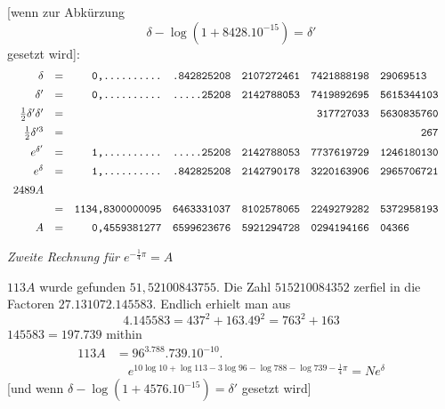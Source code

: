 [wenn zur Abkürzung
\[
\delta-\log(1+8428.10^{-15})=\delta'
\]
gesetzt wird]:
\begingroup\footnotesize\setlength{\arraycolsep}{1pt}\renewcommand{\arraystretch}{1.12}\[
\begin{array}{rcrlllll}
\delta&=&\text{\ttfamily 0,..........}&\text{\ttfamily .842825208}&\text{\ttfamily 2107272461}&\text{\ttfamily 7421888198}&\text{\ttfamily 29069513}&\\[5pt]
\delta'&=&\text{\ttfamily 0,..........}&\text{\ttfamily .....25208}&\text{\ttfamily 2142788053}&\text{\ttfamily 7419892695}&\text{\ttfamily 5615344103}&\\[5pt]
\frac12\delta'\delta'&=&&&&\text{\ttfamily \phantom{0}317727033}&\text{\ttfamily 5630835760}&\\[5pt]
\frac12\delta'^3&=&&&&&\text{\ttfamily \phantom{0000000}267}&\\[5pt]
e^{\delta'}&=&\text{\ttfamily 1,..........}&\text{\ttfamily .....25208}&\text{\ttfamily 2142788053}&\text{\ttfamily 7737619729}&\text{\ttfamily 1246180130}&\\[5pt]
e^\delta&=&\text{\ttfamily 1,..........}&\text{\ttfamily .842825208}&\text{\ttfamily 2142790178}&\text{\ttfamily 3220163906}&\text{\ttfamily 2965706721}&\\[5pt]
2489A&&&&&&&\\[5pt]
&=&\text{\ttfamily 1134,8300000095}&\text{\ttfamily 6463331037}&\text{\ttfamily 8102578065}&\text{\ttfamily 2249279282}&\text{\ttfamily 5372958193}&\\[5pt]
A&=&\text{\ttfamily 0,4559381277}&\text{\ttfamily 6599623676}&\text{\ttfamily 5921294728}&\text{\ttfamily 0294194166}&\text{\ttfamily 04366}&
\end{array}
\]\endgroup


\begin{center}\emph{Zweite Rechnung für $e^{-\frac14\pi}=A$}\end{center}

$113A$ wurde gefunden $51{,}52100843755$. Die Zahl $515210084352$ zerfiel in die Factoren $27.131072.145583$.
Endlich erhielt man aus
\[
4.145583=437^2+163.49^2=763^2+163
\]
$145583=197.739$ mithin
\[
\begin{aligned}113A&=96^3.788.739.10^{-10}.\\[7pt]&\quad{}e^{10\log10+\log113-3\log96-\log788-\log739-\frac14\pi}=Ne^\delta\end{aligned}
\]
[und wenn $\delta-\log(1+4576.10^{-15})=\delta'$ gesetzt wird]

